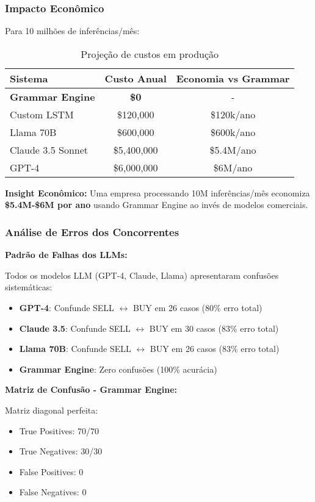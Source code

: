 \documentclass[11pt]{article}
\begin{document}
\subsubsection{Impacto Econômico}

Para 10 milhões de inferências/mês:

\begin{table}[H]
\centering
\begin{tabular}{@{}lcc@{}}
\toprule
\textbf{Sistema} & \textbf{Custo Anual} & \textbf{Economia vs Grammar} \\ \midrule
\textbf{Grammar Engine} & \textbf{\$0} & - \\
Custom LSTM & \$120,000 & \$120k/ano \\
Llama 70B & \$600,000 & \$600k/ano \\
Claude 3.5 Sonnet & \$5,400,000 & \$5.4M/ano \\
GPT-4 & \$6,000,000 & \$6M/ano \\
\bottomrule
\end{tabular}
\caption{Projeção de custos em produção}
\end{table}

\textbf{Insight Econômico:} Uma empresa processando 10M inferências/mês economiza \textbf{\$5.4M-\$6M por ano} usando Grammar Engine ao invés de modelos comerciais.

\subsubsection{Análise de Erros dos Concorrentes}

\textbf{Padrão de Falhas dos LLMs:}

Todos os modelos LLM (GPT-4, Claude, Llama) apresentaram confusões sistemáticas:
\begin{itemize}
    \item \textbf{GPT-4}: Confunde SELL $\leftrightarrow$ BUY em 26 casos (80\% erro total)
    \item \textbf{Claude 3.5}: Confunde SELL $\leftrightarrow$ BUY em 30 casos (83\% erro total)
    \item \textbf{Llama 70B}: Confunde SELL $\leftrightarrow$ BUY em 26 casos (83\% erro total)
    \item \textbf{Grammar Engine}: Zero confusões (100\% acurácia)
\end{itemize}

\textbf{Matriz de Confusão - Grammar Engine:}

Matriz diagonal perfeita:
\begin{itemize}
    \item True Positives: 70/70
    \item True Negatives: 30/30
    \item False Positives: 0
    \item False Negatives: 0
\end{itemize}
\end{document}
